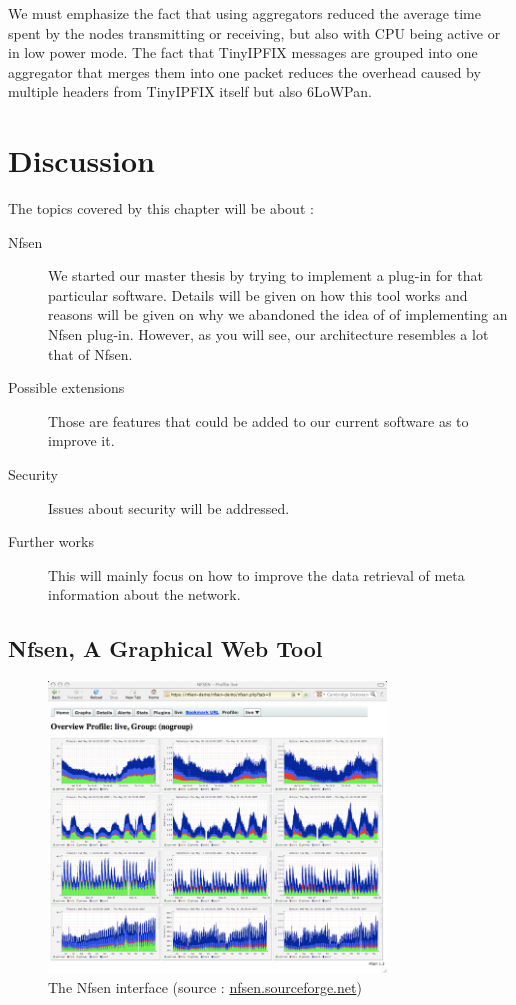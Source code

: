 We must emphasize the fact that using aggregators reduced the average time spent by the nodes transmitting or receiving, but also with CPU being active or in low power mode. The fact that TinyIPFIX messages are grouped into one aggregator that merges them into one packet reduces the overhead caused by multiple headers from TinyIPFIX itself but also 6LoWPan.


\chapter{Discussion}

The topics covered by this chapter will be about :

\begin{description}
	\item[Nfsen] We started our master thesis by trying to implement a plug-in for that particular software. Details will be given on how this tool works and reasons will be given on why we abandoned the idea of of implementing an Nfsen plug-in. However, as you will see, our architecture resembles a lot that of Nfsen.
	\item[Possible extensions] Those are features that could be added to our current software as to improve it.
	\item[Security] Issues about security will be addressed.
  \item[Further works] This will mainly focus on how to improve the data retrieval of meta information about the network.
\end{description}

\section{Nfsen, A Graphical Web Tool}

\begin{figure}[!h]
	\centering
	\includegraphics[width=0.8\textwidth]{res/nfsen.png}
	\caption{The Nfsen interface (source : \url{nfsen.sourceforge.net})}
	\label{fig:nfsen}
\end{figure}

